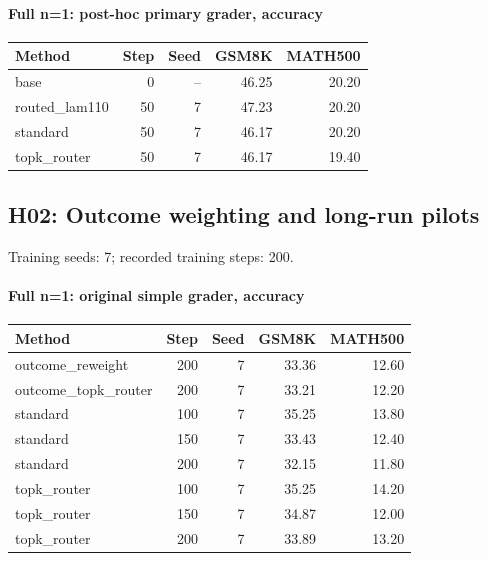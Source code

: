 \paragraph{Full n=1: post-hoc primary grader, accuracy}
{\footnotesize\setlength{\tabcolsep}{3.5pt}
\begin{longtable}{@{}p{1.4in}rrrr@{}}
\toprule
Method & Step & Seed & GSM8K & MATH500 \\
\midrule\endhead
base & 0 & -- & 46.25 & 20.20 \\
routed\_\allowbreak{}lam110 & 50 & 7 & 47.23 & 20.20 \\
standard & 50 & 7 & 46.17 & 20.20 \\
topk\_\allowbreak{}router & 50 & 7 & 46.17 & 19.40 \\
\bottomrule\end{longtable}
}
\subsection{H02: Outcome weighting and long-run pilots}
\label{history:early_outcome200}
Training seeds: 7; recorded training steps: 200.
\paragraph{Full n=1: original simple grader, accuracy}
{\footnotesize\setlength{\tabcolsep}{3.5pt}
\begin{longtable}{@{}p{1.4in}rrrr@{}}
\toprule
Method & Step & Seed & GSM8K & MATH500 \\
\midrule\endhead
outcome\_\allowbreak{}reweight & 200 & 7 & 33.36 & 12.60 \\
outcome\_\allowbreak{}topk\_\allowbreak{}router & 200 & 7 & 33.21 & 12.20 \\
standard & 100 & 7 & 35.25 & 13.80 \\
standard & 150 & 7 & 33.43 & 12.40 \\
standard & 200 & 7 & 32.15 & 11.80 \\
topk\_\allowbreak{}router & 100 & 7 & 35.25 & 14.20 \\
topk\_\allowbreak{}router & 150 & 7 & 34.87 & 12.00 \\
topk\_\allowbreak{}router & 200 & 7 & 33.89 & 13.20 \\
\bottomrule\end{longtable}
}
